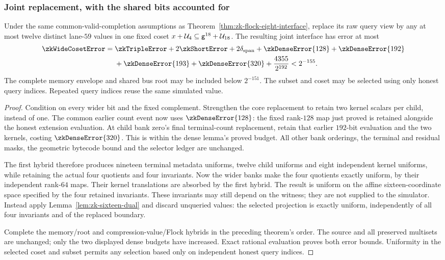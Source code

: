 \subsubsection{Joint replacement, with the shared bits accounted for}

\begin{theorem}\label{thm:zk-flock-twelve-interface}
Under the same common-valid-completion assumptions as Theorem~\ref{thm:zk-flock-eight-interface}, replace its raw query view by any at most twelve distinct lane-$59$ values in one fixed coset $x+\mathcal{U}_4\subseteq\mathsf{g}^{18}+\mathcal{U}_{18}$. The resulting joint interface has error at most
\[
 \begin{aligned}
 \zkWideCosetError={}&\zkTripleError+2\zkShortError+2\delta_{\mathrm{span}}
 +\zkDenseError{128}+\zkDenseError{192}\\
 &+\zkDenseError{193}+\zkDenseError{320}
 +\frac{4355}{2^{192}}<2^{-155}.
 \end{aligned}
\]
The complete memory envelope and shared bus root may be included below $2^{-151}$. The subset and coset may be selected using only honest query indices. Repeated query indices reuse the same simulated value.
\end{theorem}
\begin{proof}
Condition on every wider bit and the fixed complement. Strengthen the core replacement to retain two kernel scalars per child, instead of one. The common earlier count event now uses $\zkDenseError{128}$: the fixed rank-$128$ map just proved is retained alongside the honest extension evaluation. At child bank zero's final terminal-count replacement, retain that earlier $192$-bit evaluation and the two kernels, costing $\zkDenseError{320}$. This is within the dense lemma's proved budget. All other bank orderings, the terminal and residual masks, the geometric bytecode bound and the selector ledger are unchanged.

The first hybrid therefore produces nineteen terminal metadata uniforms, twelve child uniforms and eight independent kernel uniforms, while retaining the actual four quotients and four invariants. Now the wider banks make the four quotients exactly uniform, by their independent rank-$64$ maps. Their kernel translations are absorbed by the first hybrid. The result is uniform on the affine sixteen-coordinate space specified by the four retained invariants. These invariants may still depend on the witness; they are not supplied to the simulator. Instead apply Lemma~\ref{lem:zk-sixteen-dual} and discard unqueried values: the selected projection is exactly uniform, independently of all four invariants and of the replaced boundary.

Complete the memory/root and compression-value/Flock hybrids in the preceding theorem's order. The source and all preserved multisets are unchanged; only the two displayed dense budgets have increased. Exact rational evaluation proves both error bounds. Uniformity in the selected coset and subset permits any selection based only on independent honest query indices.
\end{proof}

